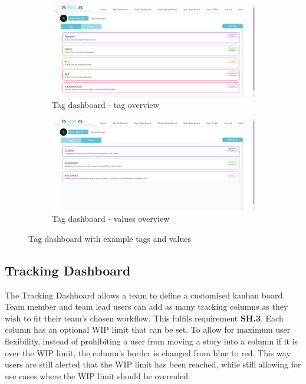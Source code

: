 \documentclass[l4proj.tex]{subfiles}
\begin{document}
\begin{figure}[h!]
\centering
\begin{subfigure}{.5\textwidth}
\centering
\includegraphics[scale=0.17]{dissertation/images/TagDashboardOne.png}
\caption{Tag dashboard - tag overview}
\end{subfigure}%
\begin{subfigure}{.5\textwidth}
\centering
\includegraphics[scale=0.17]{dissertation/images/TagDashboardTwo.png}
\caption{Tag dashboard - values overview}
\end{subfigure}

\caption{Tag dashboard with example tags and values}
\label{fig:tag dashboard}
\end{figure}

\subsection{Tracking Dashboard}
The Tracking Dashboard allows a team to define a customised kanban board. Team member and team lead users can add as many tracking columns as they wish to fit their team's chosen workflow. This fulfils requirement \textbf{SH.3}. Each column has an optional WIP limit that can be set. To allow for maximum user flexibility, instead of prohibiting a user from moving a story into a column if it is over the WIP limit, the column's border is changed from blue to red. This way users are still alerted that the WIP limit has been reached, while still allowing for use cases where the WIP limit should be overruled.
\end{document}
